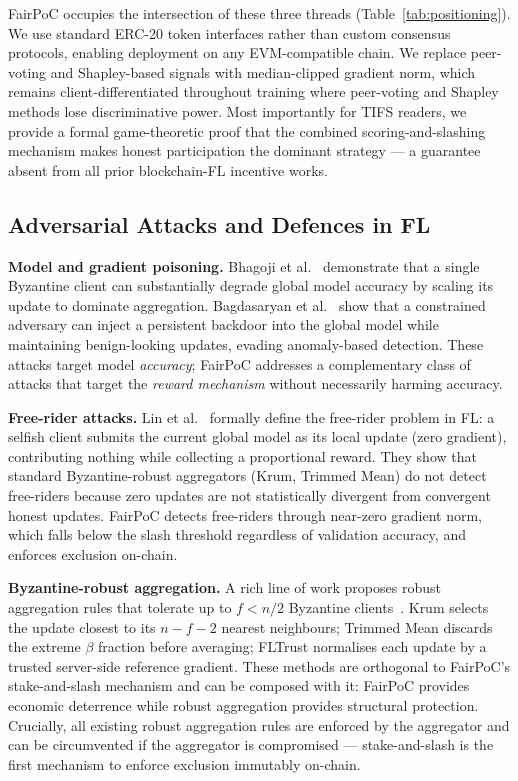 \documentclass[journal]{IEEEtran}
\theoremstyle{definition}
\theoremstyle{remark}
\begin{document}
FairPoC occupies the intersection of these three threads (Table~\ref{tab:positioning}).
We use standard ERC-20 token interfaces rather than custom
consensus protocols, enabling deployment on any EVM-compatible chain.
We replace peer-voting and Shapley-based signals with median-clipped
gradient norm, which remains client-differentiated throughout training
where peer-voting and Shapley methods lose discriminative power.
Most importantly for TIFS readers, we provide a formal game-theoretic
proof that the combined scoring-and-slashing mechanism makes honest
participation the dominant strategy --- a guarantee absent from all
prior blockchain-FL incentive works.

\subsection{Adversarial Attacks and Defences in FL}

\textbf{Model and gradient poisoning.}
Bhagoji et al.~\cite{bhagoji2019analyzing} demonstrate that a
single Byzantine client can substantially degrade global model
accuracy by scaling its update to dominate aggregation.
Bagdasaryan et al.~\cite{bagdasaryan2020backdoor} show that a
constrained adversary can inject a persistent backdoor into the
global model while maintaining benign-looking updates, evading
anomaly-based detection.
These attacks target model \emph{accuracy}; FairPoC addresses
a complementary class of attacks that target the \emph{reward
mechanism} without necessarily harming accuracy.

\textbf{Free-rider attacks.}
Lin et al.~\cite{lin2019free} formally define the free-rider
problem in FL: a selfish client submits the current global model
as its local update (zero gradient), contributing nothing while
collecting a proportional reward.
They show that standard Byzantine-robust aggregators (Krum,
Trimmed Mean) do not detect free-riders because zero updates
are not statistically divergent from convergent honest updates.
FairPoC detects free-riders through near-zero gradient norm,
which falls below the slash threshold regardless of validation
accuracy, and enforces exclusion on-chain.

\textbf{Byzantine-robust aggregation.}
A rich line of work proposes robust aggregation rules that
tolerate up to $f < n/2$ Byzantine
clients~\cite{blanchard2017machine, yin2018byzantine}.
Krum selects the update closest to its $n-f-2$ nearest neighbours;
Trimmed Mean discards the extreme $\beta$ fraction before averaging;
FLTrust normalises each update by a trusted server-side reference
gradient.
These methods are orthogonal to FairPoC's stake-and-slash
mechanism and can be composed with it: FairPoC provides economic
deterrence while robust aggregation provides structural protection.
Crucially, all existing robust aggregation rules are enforced by
the aggregator and can be circumvented if the aggregator is
compromised --- stake-and-slash is the first mechanism to enforce
exclusion immutably on-chain.
\end{document}
